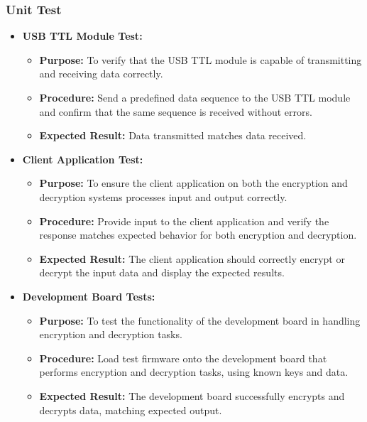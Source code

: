 \documentclass[12pt]{article}
\begin{document}
	\subsubsection*{Unit Test}
	\begin{itemize}
		\item \textbf{USB TTL Module Test:}
		\begin{itemize}
			\item \textbf{Purpose:} To verify that the USB TTL module is capable of transmitting and receiving data correctly.
			\item \textbf{Procedure:} Send a predefined data sequence to the USB TTL module and confirm that the same sequence is received without errors.
			\item \textbf{Expected Result:} Data transmitted matches data received.
		\end{itemize}
		
		\item \textbf{Client Application Test:}
		\begin{itemize}
			\item \textbf{Purpose:} To ensure the client application on both the encryption and decryption systems processes input and output correctly.
			\item \textbf{Procedure:} Provide input to the client application and verify the response matches expected behavior for both encryption and decryption.
			\item \textbf{Expected Result:} The client application should correctly encrypt or decrypt the input data and display the expected results.
		\end{itemize}
		
		\item \textbf{Development Board Tests:}
		\begin{itemize}
			\item \textbf{Purpose:} To test the functionality of the development board in handling encryption and decryption tasks.
			\item \textbf{Procedure:} Load test firmware onto the development board that performs encryption and decryption tasks, using known keys and data.
			\item \textbf{Expected Result:} The development board successfully encrypts and decrypts data, matching expected output.
		\end{itemize}
	\end{itemize}
	
\end{document}
